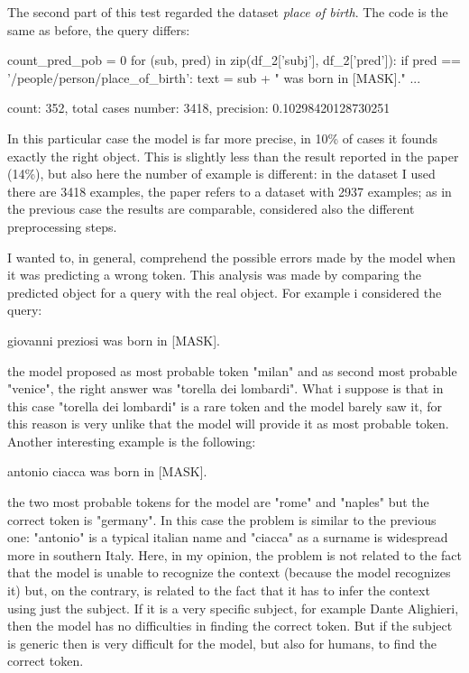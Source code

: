 \documentclass{article}
\begin{document}
The second part of this test regarded the dataset \textit{place of birth}. The code is the same as before, the query differs:
\begin{python}
count_pred_pob = 0
for (sub, pred) in zip(df_2['subj'], df_2['pred']):
  if pred == '/people/person/place_of_birth':
    text = sub + " was born in [MASK]."
    ...
\end{python}
\begin{center}
count: 352, total cases number: 3418, precision: 0.10298420128730251
\end{center}
In this particular case the model is far more precise, in 10\% of cases it founds exactly the right object. This is slightly less than the result reported in the paper (14\%), but also here the number of example is different: in the dataset I used there are 3418 examples, the paper refers to a dataset with 2937 examples; as in the previous case the results are comparable, considered also the different preprocessing steps.

I wanted to, in general, comprehend the possible errors made by the model when it was predicting a wrong token. This analysis was made by comparing the predicted object for a query with the real object. For example i considered the query:
\begin{center}
    giovanni preziosi was born in [MASK].
\end{center}
the model proposed as most probable token "milan" and as second most probable "venice", the right answer was "torella dei lombardi". What i suppose is that in this case "torella dei lombardi" is a rare token and the model barely saw it, for this reason is very unlike that the model will provide it as most probable token. 
Another interesting example is the following:
\begin{center}
antonio ciacca was born in [MASK].
\end{center}
the two most probable tokens for the model are "rome" and "naples" but the correct token is "germany". In this case the problem is similar to the previous one: "antonio" is a typical italian name and "ciacca" as a surname is widespread more in southern Italy. Here, in my opinion, the problem is not related to the fact that the model is unable to recognize the context (because the model recognizes it) but, on the contrary, is related to the fact that it has to infer the context using just the subject. If it is a very specific subject, for example Dante Alighieri, then the model has no difficulties in finding the correct token. But if the subject is generic then is very difficult for the model, but also for humans, to find the correct token. 
\end{document}
